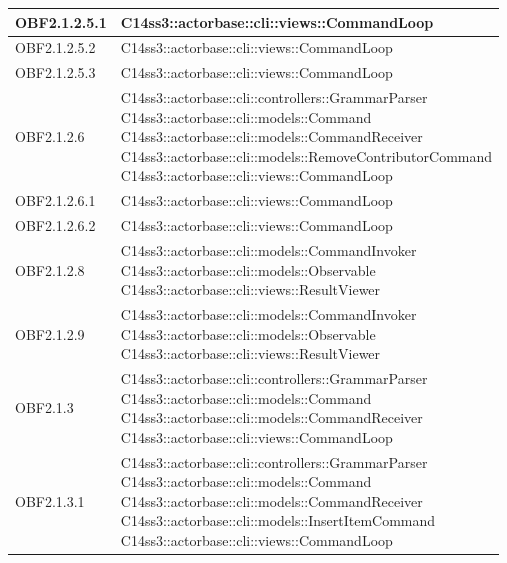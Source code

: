 \documentclass{scalatekids-article}
\begin{document}
\begin{longtable}[H]{|p{4.5cm}|p{13cm}|}
\hline
OBF2.1.2.5.1 & \multiLineCell[t]{C14ss3::actorbase::cli::views::CommandLoop\\}\\
\hline
OBF2.1.2.5.2 & \multiLineCell[t]{C14ss3::actorbase::cli::views::CommandLoop\\}\\
\hline
OBF2.1.2.5.3 & \multiLineCell[t]{C14ss3::actorbase::cli::views::CommandLoop\\}\\
\hline
OBF2.1.2.6 & \multiLineCell[t]{C14ss3::actorbase::cli::controllers::GrammarParser\\C14ss3::actorbase::cli::models::Command\\C14ss3::actorbase::cli::models::CommandReceiver\\C14ss3::actorbase::cli::models::RemoveContributorCommand\\C14ss3::actorbase::cli::views::CommandLoop\\}\\
\hline
OBF2.1.2.6.1 & \multiLineCell[t]{C14ss3::actorbase::cli::views::CommandLoop\\}\\
\hline
OBF2.1.2.6.2 & \multiLineCell[t]{C14ss3::actorbase::cli::views::CommandLoop\\}\\
\hline
OBF2.1.2.8 & \multiLineCell[t]{C14ss3::actorbase::cli::models::CommandInvoker\\C14ss3::actorbase::cli::models::Observable\\C14ss3::actorbase::cli::views::ResultViewer\\}\\
\hline
OBF2.1.2.9 & \multiLineCell[t]{C14ss3::actorbase::cli::models::CommandInvoker\\C14ss3::actorbase::cli::models::Observable\\C14ss3::actorbase::cli::views::ResultViewer\\}\\
\hline
OBF2.1.3 & \multiLineCell[t]{C14ss3::actorbase::cli::controllers::GrammarParser\\C14ss3::actorbase::cli::models::Command\\C14ss3::actorbase::cli::models::CommandReceiver\\C14ss3::actorbase::cli::views::CommandLoop\\}\\
\hline
OBF2.1.3.1 & \multiLineCell[t]{C14ss3::actorbase::cli::controllers::GrammarParser\\C14ss3::actorbase::cli::models::Command\\C14ss3::actorbase::cli::models::CommandReceiver\\C14ss3::actorbase::cli::models::InsertItemCommand\\C14ss3::actorbase::cli::views::CommandLoop\\}\\

\end{longtable}
\end{document}
